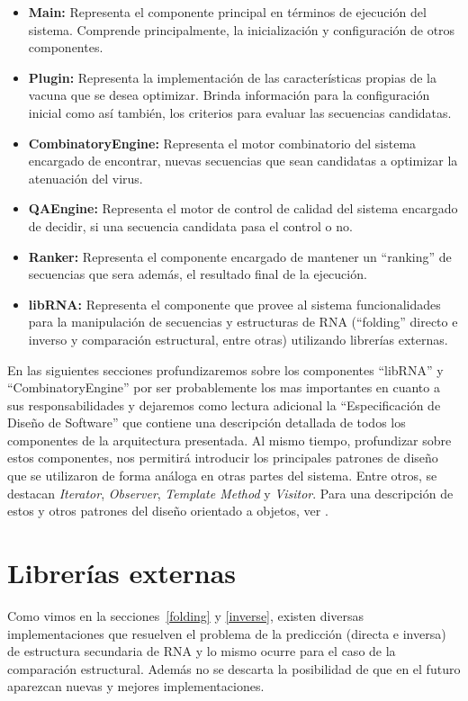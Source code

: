 \begin{itemize}
   \item \textbf{Main:} Representa el componente principal en t\'erminos de
ejecuci\'on del sistema. Comprende principalmente, la inicializaci\'on y
configuraci\'on de otros componentes.
   \item \textbf{Plugin:} Representa la implementaci\'on de las
caracter\'isticas propias de la vacuna que se desea optimizar. Brinda
informaci\'on para la configuraci\'on inicial como as\'i tambi\'en, los
criterios para evaluar las secuencias candidatas.
   \item \textbf{CombinatoryEngine:} Representa el motor combinatorio del
sistema encargado de encontrar, nuevas secuencias que sean candidatas a
optimizar la atenuaci\'on del virus.
   \item \textbf{QAEngine:} Representa el motor de control de calidad del
sistema encargado de decidir, si una secuencia candidata pasa el control o no.
   \item \textbf{Ranker:} Representa el componente encargado de mantener un
``ranking'' de secuencias que sera adem\'as, el resultado final de la
ejecuci\'on.
   \item \textbf{libRNA:} Representa el componente que provee al sistema
funcionalidades para la manipulaci\'on de secuencias y estructuras de \ac{RNA}
(``folding'' directo e inverso y comparaci\'on estructural, entre otras)
utilizando librer\'ias externas.
  \end{itemize}

En las siguientes secciones profundizaremos sobre los componentes ``libRNA'' y
``CombinatoryEngine'' por ser probablemente los mas importantes en cuanto a sus
responsabilidades y dejaremos como lectura adicional la ``Especificaci\'on de
Dise\~no de Software'' que contiene una descripci\'on detallada de todos los
componentes de la arquitectura presentada. Al mismo tiempo, profundizar sobre
estos componentes, nos permitir\'a introducir los principales patrones de
dise\~no que se utilizaron de forma an\'aloga en otras partes del sistema.
Entre otros, se destacan \textit{Iterator}, \textit{Observer}, \textit{Template
Method} y \textit{Visitor}. Para una descripci\'on de estos y otros patrones
del dise\~no orientado a objetos, ver \cite{Gamma95}.

\section{Librer\'ias externas}
\label{diseno-libRNA}
Como vimos en la secciones~\ref{folding} y \ref{inverse}, existen diversas
implementaciones que resuelven el problema de la predicci\'on (directa e
inversa) de estructura secundaria de \ac{RNA} y lo mismo ocurre para el caso de
la comparaci\'on estructural. Adem\'as no se descarta la posibilidad de que en
el futuro aparezcan nuevas y mejores implementaciones. 

